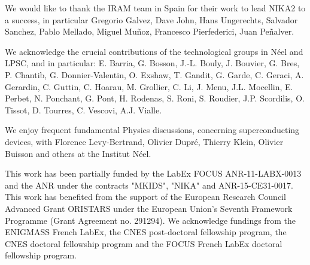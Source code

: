 \documentclass[]{aa} %
\begin{document}


\begin{acknowledgements}
We would like to thank the IRAM team in Spain for their work to lead NIKA2 to a success, in particular Gregorio Galvez, Dave John, Hans Ungerechts, Salvador Sanchez, Pablo Mellado, Miguel Mu\~noz, Francesco Pierfederici, Juan Pe\~nalver.

We acknowledge the crucial contributions of the technological groups in N\'eel and LPSC, and in particular: E. Barria, G. Bosson, J.-L. Bouly, J. Bouvier, G. Bres, P. Chantib, G. Donnier-Valentin,  O. Exshaw, T. Gandit, G. Garde, C. Geraci, A. Gerardin, C. Guttin, C. Hoarau, M. Grollier, C. Li, J. Menu, J.L. Mocellin, E. Perbet, N. Ponchant, G. Pont, H. Rodenas, S. Roni, S. Roudier, J.P. Scordilis, O. Tissot, D. Tourres, C. Vescovi, A.J. Vialle. 

We enjoy frequent fundamental Physics discussions, concerning superconducting devices, with Florence Levy-Bertrand, Olivier Dupr\'e, Thierry Klein, Olivier Buisson and others at the Institut N\'eel.

This work has been partially funded by the LabEx FOCUS ANR-11-LABX-0013 and 
the ANR under the contracts "MKIDS", "NIKA" and ANR-15-CE31-0017. 
This work has benefited from the support of the European Research Council Advanced Grant ORISTARS under the European Union's Seventh Framework Programme (Grant Agreement no. 291294). We acknowledge fundings from the ENIGMASS French LabEx, 
the CNES post-doctoral fellowship program,  the CNES doctoral fellowship program and the FOCUS French LabEx doctoral fellowship program.


\end{acknowledgements}


%
%


%
% 
\end{document}
